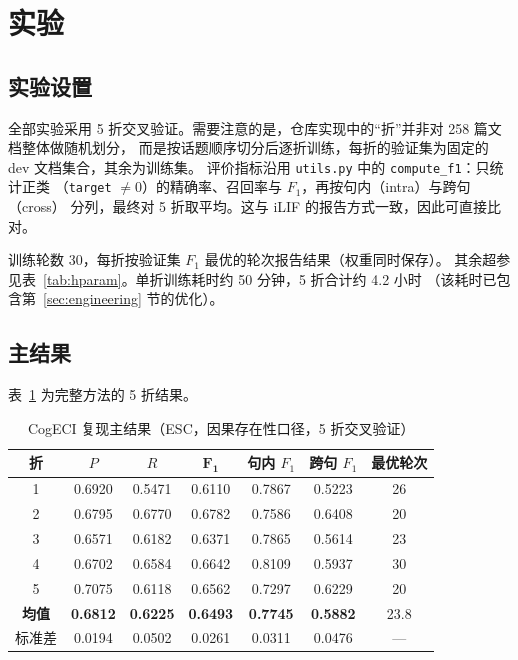 \section{实验}
\label{sec:exp}

\subsection{实验设置}

全部实验采用 5 折交叉验证。需要注意的是，仓库实现中的“折”并非对 258 篇文档整体做随机划分，
而是按话题顺序切分后逐折训练，每折的验证集为固定的 dev 文档集合，其余为训练集。
评价指标沿用 \texttt{utils.py} 中的 \texttt{compute\_f1}：只统计正类
（\texttt{target} $\ne 0$）的精确率、召回率与 $F_1$，再按句内（intra）与跨句（cross）
分列，最终对 5 折取平均。这与 iLIF 的报告方式一致，因此可直接比对。

训练轮数 30，每折按验证集 $F_1$ 最优的轮次报告结果（权重同时保存）。
其余超参见表~\ref{tab:hparam}。单折训练耗时约 50 分钟，5 折合计约 4.2 小时
（该耗时已包含第~\ref{sec:engineering} 节的优化）。

\subsection{主结果}

表~\ref{tab:main} 为完整方法的 5 折结果。

\begin{table}[H]
\centering
\caption{CogECI 复现主结果（ESC，因果存在性口径，5 折交叉验证）}
\label{tab:main}
\small
\begin{tabular}{ccccccc}
\toprule
折 & $P$ & $R$ & $\bm{F_1}$ & 句内 $F_1$ & 跨句 $F_1$ & 最优轮次\\
\midrule
1 & 0.6920 & 0.5471 & 0.6110 & 0.7867 & 0.5223 & 26\\
2 & 0.6795 & 0.6770 & 0.6782 & 0.7586 & 0.6408 & 20\\
3 & 0.6571 & 0.6182 & 0.6371 & 0.7865 & 0.5614 & 23\\
4 & 0.6702 & 0.6584 & 0.6642 & 0.8109 & 0.5937 & 30\\
5 & 0.7075 & 0.6118 & 0.6562 & 0.7297 & 0.6229 & 20\\
\midrule
\textbf{均值} & \textbf{0.6812} & \textbf{0.6225} & \textbf{0.6493} & \textbf{0.7745} & \textbf{0.5882} & 23.8\\
标准差 & 0.0194 & 0.0502 & 0.0261 & 0.0311 & 0.0476 & ---\\
\bottomrule
\end{tabular}
\end{table}


